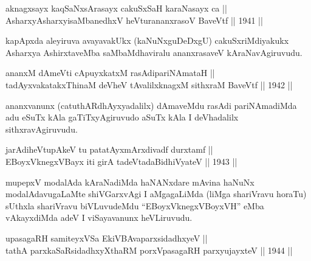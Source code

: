 
\begin{shl}
aknagxsayx kaqSaNxsArasayx cakuSxSaH karaNasayx ca || \\
AsharxyAsharxyisaMbanedhxV heVturananxrasoV BaveVtf ||  1941 ||  
\end{shl}

\begin{artha}
kapApxda aleyiruva avayavakUkx (kaNuNxguDeDxgU) cakuSxriMdiyakukx
Asharxya AshirxtaveMba saMbaMdhaviralu ananxrasaveV kAraNavAgiruvudu.
\end{artha}


\begin{shl}
ananxM dAmeVti cApuyxkatxM rasAdipariNAmataH || \\
tadAyxvakatakxThinaM deVheV tAvalilxknagxM sithxraM BaveVtf ||  1942 ||  
\end{shl}

\begin{artha}
ananxvanunx (catuthARdhAyxyadalilx) dAmaveMdu rasAdi pariNAmadiMda adu
eSuTx kAla gaTiTxyAgiruvudo aSuTx kAla I deVhadalilx sithxravAgiruvudu.
\end{artha}


\begin{shl}
jarAdiheVtupAkeV tu patatAyxmArxdivadf durxtamf || \\
EBoyxV\s knegxVBayx iti girA tadeVtadaBidhiVyateV ||  1943 ||  
\end{shl}

\begin{artha}
mupepxV modalAda kAraNadiMda haNANxdare mAvina haNuNx
modalAdavugaLaMte shiVGarxvAgi I aMgagaLiMda (liMga shariVravu horaTu)
sUthxla shariVravu biVLuvudeMdu ``EBoyxV\s knegxVBoyxVH'' eMba vAkayxdiMda adeV I
viSayavanunx heVLiruvudu.
\end{artha}


\begin{shl}
upasagaRH samiteyxVSa EkiVBAvaparxsidadhxyeV || \\
tathA parxkaSaRsidadhxyXthaRM porxVpasagaRH parxyujayxteV ||  1944 ||  
\end{shl}

